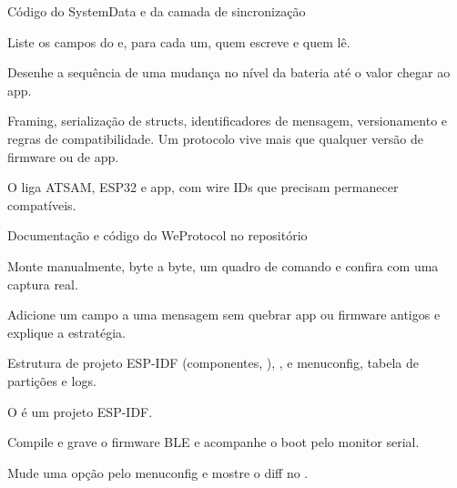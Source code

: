 \begin{paraestudar}
  \item Código do SystemData e da camada de sincronização
\end{paraestudar}

\begin{pratique}
  \item Liste os campos do  e, para cada um, quem escreve e quem lê.
  \item Desenhe a sequência de uma mudança no nível da bateria até o valor chegar ao app.
\end{pratique}

Framing, serialização de structs, identificadores de mensagem, versionamento e regras de compatibilidade. Um protocolo vive mais que qualquer versão de firmware ou de app.

\begin{noproduto}
O  liga ATSAM, ESP32 e app, com wire IDs que precisam permanecer compatíveis.
\end{noproduto}

\begin{paraestudar}
  \item Documentação e código do WeProtocol no repositório
\end{paraestudar}

\begin{pratique}
  \item Monte manualmente, byte a byte, um quadro de comando e confira com uma captura real.
  \item Adicione um campo a uma mensagem sem quebrar app ou firmware antigos e explique a estratégia.
\end{pratique}

Estrutura de projeto ESP-IDF (componentes, ), ,  e menuconfig, tabela de partições e logs.

\begin{noproduto}
O  é um projeto ESP-IDF.
\end{noproduto}

\begin{paraestudar}
  \item {}
\end{paraestudar}

\begin{pratique}
  \item Compile e grave o firmware BLE e acompanhe o boot pelo monitor serial.
  \item Mude uma opção pelo menuconfig e mostre o diff no .
\end{pratique}

